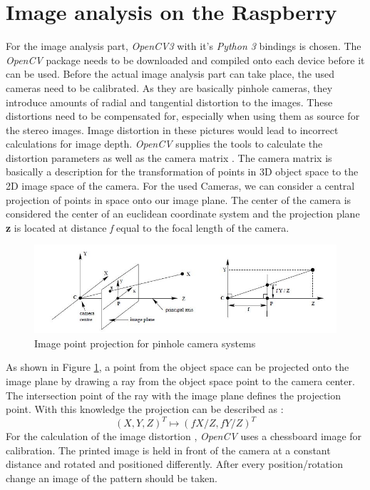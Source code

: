 \section{Image analysis on the Raspberry}
For the image analysis part, \textit{OpenCV3} with it's \textit{Python 3} bindings is chosen. The \textit{OpenCV} package needs to be downloaded and compiled onto each device before it can be used.
Before the actual image analysis part can take place, the used cameras need to be calibrated. As they are basically pinhole cameras, they introduce amounts of radial and tangential distortion to the images. These distortions need to be compensated for, especially when using them as source for the stereo images. Image distortion in these pictures would lead to incorrect calculations for image depth.
\textit{OpenCV} supplies the tools to calculate the distortion parameters as well as the camera matrix \cite{Opencv.2018}.
The camera matrix is basically a description for the transformation of points in 3D object space to the 2D image space of the camera. For the used Cameras, we can consider a central projection of points in space onto our image plane. The center of the camera is considered the center of an euclidean coordinate system and the projection plane \textbf{z} is located at distance \textit{f} equal to the focal length of the camera.
\begin{figure}[H]
\includegraphics[width=\textwidth]{images/pionhole.JPG}
\caption{Image point projection for pinhole camera systems\cite{Hartley.2000}}
\label{pinholecamera_mapping} 
\end{figure}
As shown in Figure \ref{pinholecamera_mapping}, a point from the object space can be projected onto the image plane by drawing a ray from the object space point to the camera center. The intersection point of the ray with the image plane defines the projection point. With this knowledge the projection can be described as :
\begin{equation}
(X,Y,Z)^{T} \mapsto (fX/Z,fY/Z)^{T}
\end{equation}
For the calculation of the image distortion , \textit{OpenCV} uses a chessboard image for calibration\cite{Opencv.2018b}. The printed image is held in front of the camera at a constant distance and rotated and positioned differently. After every position/rotation change an image of the pattern should be taken.
